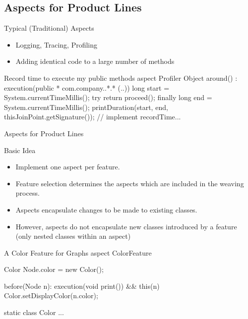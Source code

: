 \subsection{Aspects for Product Lines}

\begin{frame}[fragile]{Typical (Traditional) Aspects}
	\begin{itemize}
		\item Logging, Tracing, Profiling
		\item Adding identical code to a large number of methods
	\end{itemize}
\begin{codetight}{Record time to execute my public methods}
aspect Profiler {   
    Object around() : execution(public * com.company..*.* (..)) {
        long start = System.currentTimeMillis();
        try {
            return proceed();
        } finally {
            long end = System.currentTimeMillis();
            printDuration(start, end, 
                thisJoinPoint.getSignature());
        }
    }
    // implement recordTime...
}
\end{codetight}	
\end{frame}

\begin{frame}[fragile]{Aspects for Product Lines}
	\begin{mycolumns}[widths={45},animation=none]
		\begin{definition}{Basic Idea}
			\begin{itemize}
				\item Implement one aspect per feature.
				\item Feature selection determines the aspects which are included in the weaving process.
			\end{itemize}
		\end{definition}
		\begin{note}{}
			\begin{itemize}
				\item Aspects encapsulate changes to be made to existing classes. 
				\item However, aspects do not encapsulate new classes introduced by a feature (only nested classes within an aspect)%
			\end{itemize}
		\end{note}
	\mynextcolumn
\begin{codetight}{A Color Feature for Graphs}
aspect ColorFeature {
	Color Node.color = new Color();
	
	before(Node n): execution(void print()) && this(n) {
		Color.setDisplayColor(n.color);
	}
	
	static class Color {
		...
	}
}
\end{codetight}	
	\end{mycolumns}
\end{frame}

